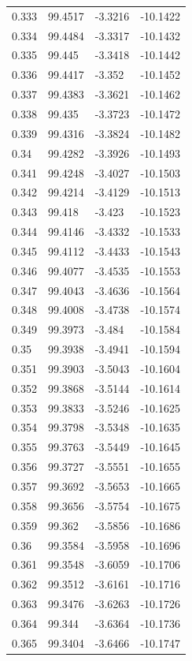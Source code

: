 \begin{tabular}{llll}
0.333 & 99.4517 & -3.3216 & -10.1422 \\
0.334 & 99.4484 & -3.3317 & -10.1432 \\
0.335 & 99.445 & -3.3418 & -10.1442 \\
0.336 & 99.4417 & -3.352 & -10.1452 \\
0.337 & 99.4383 & -3.3621 & -10.1462 \\
0.338 & 99.435 & -3.3723 & -10.1472 \\
0.339 & 99.4316 & -3.3824 & -10.1482 \\
0.34 & 99.4282 & -3.3926 & -10.1493 \\
0.341 & 99.4248 & -3.4027 & -10.1503 \\
0.342 & 99.4214 & -3.4129 & -10.1513 \\
0.343 & 99.418 & -3.423 & -10.1523 \\
0.344 & 99.4146 & -3.4332 & -10.1533 \\
0.345 & 99.4112 & -3.4433 & -10.1543 \\
0.346 & 99.4077 & -3.4535 & -10.1553 \\
0.347 & 99.4043 & -3.4636 & -10.1564 \\
0.348 & 99.4008 & -3.4738 & -10.1574 \\
0.349 & 99.3973 & -3.484 & -10.1584 \\
0.35 & 99.3938 & -3.4941 & -10.1594 \\
0.351 & 99.3903 & -3.5043 & -10.1604 \\
0.352 & 99.3868 & -3.5144 & -10.1614 \\
0.353 & 99.3833 & -3.5246 & -10.1625 \\
0.354 & 99.3798 & -3.5348 & -10.1635 \\
0.355 & 99.3763 & -3.5449 & -10.1645 \\
0.356 & 99.3727 & -3.5551 & -10.1655 \\
0.357 & 99.3692 & -3.5653 & -10.1665 \\
0.358 & 99.3656 & -3.5754 & -10.1675 \\
0.359 & 99.362 & -3.5856 & -10.1686 \\
0.36 & 99.3584 & -3.5958 & -10.1696 \\
0.361 & 99.3548 & -3.6059 & -10.1706 \\
0.362 & 99.3512 & -3.6161 & -10.1716 \\
0.363 & 99.3476 & -3.6263 & -10.1726 \\
0.364 & 99.344 & -3.6364 & -10.1736 \\
0.365 & 99.3404 & -3.6466 & -10.1747 \\

\end{tabular}
